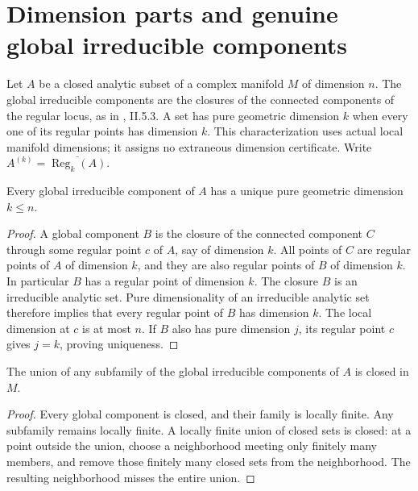 \section{Dimension parts and genuine global irreducible components}

Let $A$ be a closed analytic subset of a complex manifold $M$ of dimension $n$.
The global irreducible components are the closures of the connected components
of the regular locus, as in \cite{demailly-cadg}, II.5.3. A set has pure
geometric dimension $k$ when every one of its regular points has dimension $k$.
This characterization uses actual local manifold dimensions; it assigns no
extraneous dimension certificate. Write $A^{(k)}=\overline{\operatorname{Reg}_k(A)}$.

\begin{lemma}
\label{hir:global-component-pure-geometric-dimension}
\leanok
Every global irreducible component of $A$ has a unique pure geometric dimension
$k\leq n$.
\end{lemma}
\begin{proof}
A global component $B$ is the closure of the connected component $C$ through
some regular point $c$ of $A$, say of dimension $k$. All points of $C$ are
regular points of $A$ of dimension $k$, and they are also regular points of
$B$ of dimension $k$. In particular $B$ has a regular point of dimension $k$.
The closure $B$ is an irreducible analytic set. Pure dimensionality of an
irreducible analytic set therefore implies that every regular point of $B$
has dimension $k$. The local dimension at $c$ is at most $n$. If $B$ also has
pure dimension $j$, its regular point $c$ gives $j=k$, proving uniqueness.
\end{proof}

\begin{lemma}
\label{hir:closed-global-component-subunion}
\leanok
The union of any subfamily of the global irreducible components of $A$ is
closed in $M$.
\end{lemma}
\begin{proof}
Every global component is closed, and their family is locally finite. Any
subfamily remains locally finite. A locally finite union of closed sets is
closed: at a point outside the union, choose a neighborhood meeting only
finitely many members, and remove those finitely many closed sets from the
neighborhood. The resulting neighborhood misses the entire union.
\end{proof}

